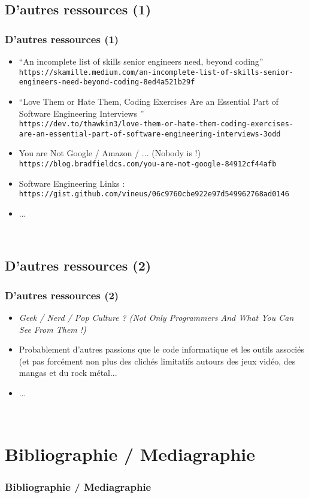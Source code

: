 \documentclass{beamer}
\begin{document}
\subsection{D'autres ressources (1)}
\begin{frame}
	\frametitle{D'autres ressources (1)}
	\begin{itemize}
		\small
		\item ``An incomplete list of skills senior engineers need, beyond coding''~\\
			\texttt{\footnotesize https://skamille.medium.com/an-incomplete-list-of-skills-senior-engineers-need-beyond-coding-8ed4a521b29f }
		\item ``Love Them or Hate Them, Coding Exercises Are an Essential Part of Software Engineering Interviews ''~\\
			\texttt{\footnotesize https://dev.to/thawkin3/love-them-or-hate-them-coding-exercises-are-an-essential-part-of-software-engineering-interviews-3odd }
		\item You are Not Google / Amazon / ... (Nobody is !)~\\
			\texttt{\footnotesize https://blog.bradfieldcs.com/you-are-not-google-84912cf44afb }
		\item Software Engineering Links : \texttt{\footnotesize https://gist.github.com/vineus/06c9760cbe922e97d549962768ad0146 }
		\item ... 
	\end{itemize}~\\
	
\end{frame} 

\subsection{D'autres ressources (2)}
\begin{frame}
	\frametitle{D'autres ressources (2)}
	\begin{itemize}
		\item \emph{Geek / Nerd / Pop Culture ? (Not Only Programmers And What You Can See From Them !)}
		\item Probablement d'autres passions que le code informatique et les outils associ{\'e}s (et pas forc{\'e}ment non plus des clich{\'e}s limitatifs autours des jeux vid{\'e}o, des mangas et du rock m{\'e}tal...
		\item ... 
	\end{itemize}~\\
	
\end{frame} 

\def\sectionPartBibliographie{Bibliographie / Mediagraphie}
\section{\sectionPartBibliographie}
\begin{frame}
	\frametitle{\sectionPartBibliographie}
	\nocite{*}
	
	
\end{frame}
\end{document}
